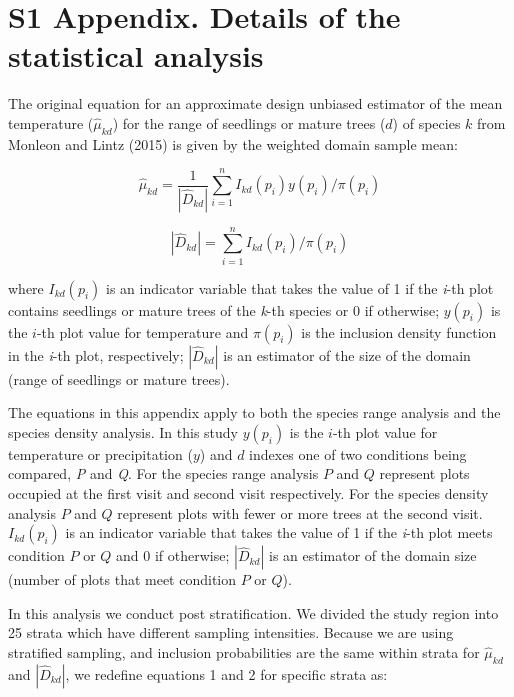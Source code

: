 \documentclass[12pt]{article}
\begin{document}
\pagestyle{plain}

\section*{S1 Appendix.  Details of the statistical analysis}

The original equation for an approximate design unbiased estimator of the mean temperature ($\hat{\mu}_{kd}$) for the range of seedlings or mature trees ($d$) of species $k$ from Monleon and Lintz (2015) is given by the weighted domain sample mean:

\begin{equation}
\hat{\mu}_{kd} = \frac{1}{|\hat{D}_{kd}|}\displaystyle\sum_{i=1}^{n} I_{kd}(p_i)y(p_i)/\pi(p_i)  
\end{equation} 

\begin{equation}
|\hat{D}_{kd}| = \displaystyle\sum_{i=1}^{n} I_{kd}(p_i)/\pi(p_i)  
\end{equation} 

where $I_{kd}(p_i)$ is an indicator variable that takes the value of 1 if the \emph{i}-th plot contains seedlings or mature trees of the \emph{k}-th species or 0 if otherwise; $y(p_i)$ is the $i$-th plot value for temperature and $\pi(p_i)$ is the inclusion density function in the \emph{i}-th plot, respectively; $|\hat{D}_{kd}|$ is an estimator of the size of the domain (range of seedlings or mature trees).

The equations in this appendix apply to both the species range analysis and the species density analysis.  In this study $y(p_i)$ is the $i$-th plot value for temperature or precipitation ($y$) and $d$ indexes one of two conditions being compared, \emph{P} and \emph{Q}.  For the species range analysis $P$ and $Q$ represent plots occupied at the first visit and second visit respectively.  For the species density analysis $P$ and $Q$  represent plots with fewer or more trees at the second visit.  $I_{kd}(p_i)$ is an indicator variable that takes the value of 1 if the \emph{i}-th plot meets condition $P$ or $Q$ and 0 if otherwise; $|\hat{D}_{kd}|$ is an estimator of the domain size (number of plots that meet condition $P$ or $Q$).

In this analysis we conduct post stratification.  We divided the study region into 25 strata which have different sampling intensities.  Because we are using stratified sampling, and inclusion probabilities are the same within strata for $\hat{\mu}_{kd}$ and $|\hat{D}_{kd}|$, we redefine equations 1 and 2 for specific strata as: 
\end{document}

